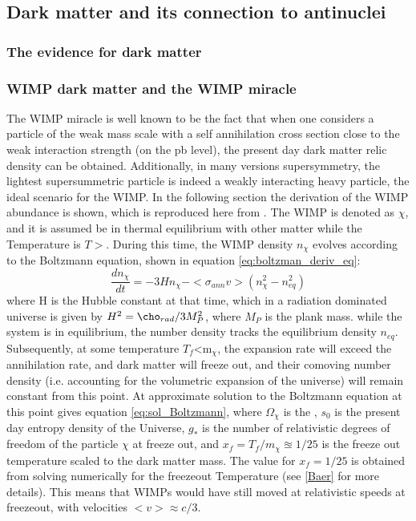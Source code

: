 \subsection{Dark matter and its connection to antinuclei}

\subsubsection{The evidence for dark matter}
\subsubsection{WIMP dark matter and the WIMP miracle}\label{sec:IntroWIMPs}
The WIMP miracle is well known to be the fact that when one considers a particle of the weak mass scale with a self annihilation cross section close to the weak interaction strength (on the pb level), the present day dark matter relic density can be obtained. Additionally, in many versions supersymmetry, the lightest supersummetric particle is indeed a weakly interacting heavy particle, the ideal scenario for the WIMP\cite{}. In the following section the derivation of the WIMP abundance is shown, which is reproduced here from \cite{Baer-Choi-Kim}. The WIMP is denoted as $\chi$, and it is assumed be in thermal equilibrium with other matter while the Temperature is $T>$\dmm . During this time, the WIMP density $n_\chi$ evolves according to the Boltzmann equation, shown in equation \ref{eq:boltzman_deriv_eq}: 
\begin{equation}\label{eq:boltzman_deriv_eq}
    \frac{dn_\chi}{dt} = -3H n_\chi - <\sigma_{ann}v>(n_\chi^2 - n_{eq}^2)
\end{equation}
where H is the Hubble constant at that time, which in a radiation dominated universe is given by $H^2 = \cho_{rad}/3M^2_P$, where $M_P$ is the plank mass. while the system is in equilibrium, the number density tracks the equilibrium density $n_{eq}$. Subsequently, at some temperature $T_f$<m$_\chi$, the expansion rate will exceed the annihilation rate, and dark matter will freeze out, and their comoving number density (i.e. accounting for the volumetric expansion of the universe) will remain constant from this point. At approximate solution to the Boltzmann equation at this point gives equation \ref{eq:sol_Boltzmann}, where $\Omega_\chi$ is the , $s_0$ is the present day entropy density of the Universe, $g_*$ is the number of relativistic degrees of freedom of the particle $\chi$ at freeze out, and $x_f = T_f/m_\chi \approxeq 1/25$ is the freeze out temperature scaled to the dark matter mass. The value for $x_f=1/25$ is obtained from solving numerically for the freezeout Temperature (see \ref{Baer} for more details). This means that WIMPs would have still moved at relativistic speeds at freezeout, with velocities $<v>\approx c/3$. 

